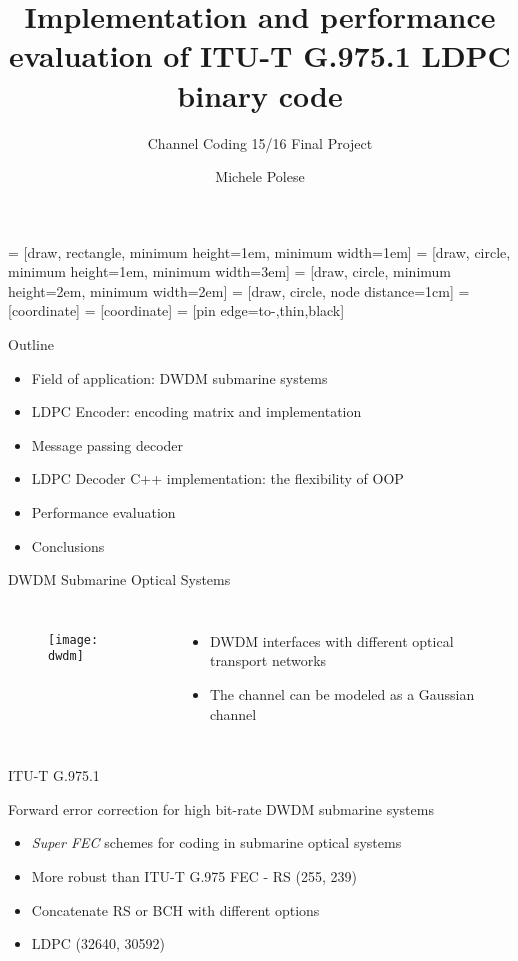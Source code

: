 \documentclass[pdf]
          {beamer}
\title{Implementation and performance evaluation of ITU-T G.975.1 LDPC binary code}
\subtitle{Channel Coding 15/16 Final Project}
\author{Michele Polese}
\begin{document}
 = [draw, rectangle, 
    minimum height=1em, minimum width=1em]
 = [draw, circle, minimum height=1em, minimum width=3em]
 = [draw, circle, minimum height=2em, minimum width=2em]
 = [draw, circle, node distance=1cm]
 = [coordinate]
 = [coordinate]
 = [pin edge={to-,thin,black}]

\begin{frame}
    \titlepage
\end{frame}
\begin{frame}{Outline}
    \begin{itemize}
    	\item Field of application: DWDM submarine systems
 		\item LDPC Encoder: encoding matrix and implementation
 		\item Message passing decoder
 		\item LDPC Decoder C++ implementation: the flexibility of OOP
 		\item Performance evaluation
 		\item Conclusions
	\end{itemize}
\end{frame}

\begin{frame}{DWDM Submarine Optical Systems}
	\begin{columns}
			\begin{figure}
				\centering
				\texttt{[image: dwdm]}
			\end{figure}
			\begin{itemize}
				\item DWDM interfaces with different optical transport networks
				\item The channel can be modeled as a Gaussian channel
			\end{itemize}
	\end{columns}
\end{frame}

\begin{frame}{ITU-T G.975.1}
	\begin{center}
	Forward error correction for high bit-rate DWDM submarine systems 
	\end{center}
	\begin{itemize}
		\item \textit{Super FEC} schemes for coding in submarine optical systems
		\item More robust than ITU-T G.975 FEC - RS (255, 239)
		\item Concatenate RS or BCH with different options
		\item LDPC (32640, 30592)
	\end{itemize}
	
\end{frame}
\end{document}
